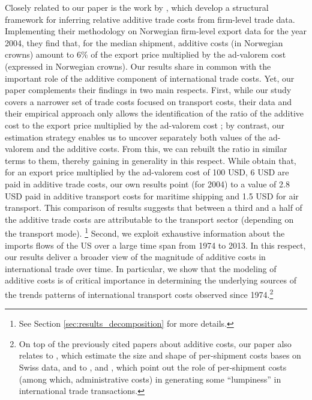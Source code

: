 \documentclass[a4paper,11pt]{article}
\begin{document}
Closely related to our paper is the work by \citet{Irrazabal_2015}, which develop a structural framework for inferring relative additive trade costs from firm-level trade data. Implementing their methodology on Norwegian firm-level export data for the year 2004, they find that, for the median shipment, additive costs (in Norwegian crowns) amount to 6\% of the export price multiplied by the ad-valorem cost (expressed in Norwegian crowns). Our results share in common with \citet{Irrazabal_2015} the important role of the additive component of international trade costs. Yet, our paper complements their findings in two main respects. First, while our study covers a narrower set of trade costs focused on transport costs, their data and their empirical approach only allows the identification of the ratio of the additive cost to the export price multiplied by the ad-valorem cost ; by contrast, our estimation strategy enables us to uncover separately both values of the ad-valorem and the additive costs. From this, we can rebuilt the ratio in similar terms to them, thereby gaining in generality in this respect. While \citet{Irrazabal_2015} obtain that, for an export price multiplied by the ad-valorem cost of 100 USD, 6 USD are paid in additive trade costs, our own results point (for 2004) to a value of 2.8 USD paid in additive transport costs for maritime shipping and 1.5 USD for air transport. This comparison of results suggests that between a third and a half of the additive trade costs are attributable to the transport sector (depending on the transport mode). \footnote{See Section \ref{sec:results_decomposition} for more details.} Second, we exploit exhaustive information about the imports flows of the US over a large time span from 1974 to 2013. In this respect, our results deliver a broader view of the magnitude of additive costs in international trade over time. In particular, we show that the modeling of additive costs is of critical importance in determining the underlying sources of the trends patterns of international transport costs observed since 1974.\footnote{On top of the previously cited papers about additive costs, our paper also relates to \citet{Kropf-Saure-JIE-2016}, which estimate the size and shape of per-shipment costs bases on Swiss data, and to \citet{Alessandria-et-al-AER-2010}, \citet{Hornok-et-al-RES-2015} and \citet{Hornok-et-al-JIE-2015}, which point out the role of per-shipment costs (among which, administrative costs) in generating some ``lumpiness'' in international trade transactions.} \smallskip
\end{document}
